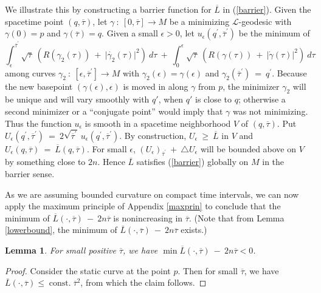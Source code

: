 \documentclass[12pt]{amsart}
\newcommand{\const}{\operatorname{const.}}
\newcommand{\ga}{\gamma}
\numberwithin{equation}{section}
\theoremstyle{plain}
\newtheorem{lemma}[equation]{Lemma}
\theoremstyle{definition}
\theoremstyle{remark}
\begin{document}
We illustrate this by constructing a barrier function for
$\overline{L}$ in (\ref{barrier}). Given the spacetime point
$(q, \overline{\tau})$, let $\gamma \: : \: [0, \overline{\tau}]
\rightarrow M$ be a minimizing ${\mathcal L}$-geodesic with
$\gamma(0) = p$ and $\gamma(\overline{\tau}) = q$. Given a small
$\epsilon > 0$, let 
$u_\epsilon(q^\prime, \overline{\tau}^\prime)$ be the minimum of
\begin{equation}
\int_{\epsilon}^{\overline{\tau}^\prime} \sqrt{\tau} \: \left( 
R(\gamma_2(\tau)) \: + \:
\big| \dot{\gamma_2}(\tau) \big|^2 \right) \: d\tau \: + \:
\int_{0}^{\epsilon} \sqrt{\tau} \: \left( 
R(\gamma(\tau)) \: + \:
\big| \dot{\gamma}(\tau) \big|^2 \right) \: d\tau 
\end{equation}
among curves $\gamma_2 \: : \: [\epsilon, \overline{\tau}^\prime] 
\rightarrow M$
with $\gamma_2(\epsilon) = \gamma(\epsilon)$ and
$\gamma_2(\overline{\tau}^\prime) \: = \: q^\prime$.
Because the
new basepoint $(\gamma(\epsilon), \epsilon)$ 
is moved in along $\gamma$
from $p$, the minimizer $\ga_2$  will be unique and will vary smoothly with $q'$, when
$q'$ is close to $q$; otherwise a second minimizer or a ``conjugate 
point'' would imply that $\ga$ was not minimizing. Thus the function $u_\epsilon$ 
is smooth in a spacetime 
neighborhood $V$ of
$(q, \overline{\tau})$. Put 
$U_\epsilon(q^\prime, \overline{\tau}^\prime) \: = \:
2 \sqrt{\overline{\tau}^\prime} \: 
u_\epsilon(q^\prime, \overline{\tau}^\prime)$.
By construction, $U_\epsilon \: \ge \: \overline{L}$ in $V$ and
$U_\epsilon(q, \overline{\tau}) \: = \: \overline{L}(q, \overline{\tau})$.
For small $\epsilon$, 
$(U_\epsilon)_{\overline{\tau}^\prime} \: + \: \triangle U_\epsilon$ 
will be bounded above
on $V$ by something close to $2n$. Hence
$\overline{L}$ satisfies (\ref{barrier}) globally on $M$ in the barrier sense.

As we are assuming bounded curvature on compact time intervals,
we can now apply the maximum principle of Appendix \ref{maxprin}
to conclude that the minimum of $\overline{L}(\cdot, \overline{\tau})
\: - \: 2n \overline{\tau}$ is nonincreasing in $\overline{\tau}$.  
(Note that from Lemma \ref{lowerbound}, the minimum of
$\overline{L}(\cdot, \overline{\tau})
\: - \: 2n \overline{\tau}$ exists.)


\begin{lemma} \label{neg}
For small positive $\overline{\tau}$, we have 
$\min \overline{L}(\cdot, \overline{\tau})
\: - \: 2n \overline{\tau} < 0$.
\end{lemma}
\begin{proof}
Consider the
static curve at the point $p$. Then 
for small $\overline{\tau}$, we have 
$\overline{L}(\cdot, \overline{\tau}) \le \const \overline{\tau}^2$,
from which the claim follows.
\end{proof}
\end{document}
